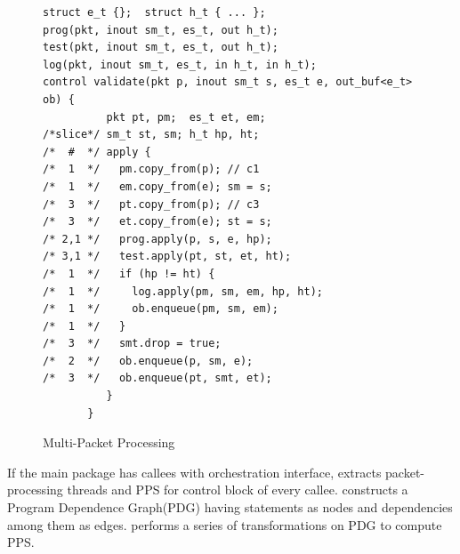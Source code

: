 \documentclass[letterpaper,twocolumn,10pt]{article}
\begin{document}
\label{subsubsection:packet-processing-schedule}
\begin{figure}[!h]
\begin{lstlisting}[frame=none]
struct e_t {};  struct h_t { ... };
prog(pkt, inout sm_t, es_t, out h_t);
test(pkt, inout sm_t, es_t, out h_t);
log(pkt, inout sm_t, es_t, in h_t, in h_t);
control validate(pkt p, inout sm_t s, es_t e, out_buf<e_t> ob) {
          pkt pt, pm;  es_t et, em;  
/*slice*/ sm_t st, sm; h_t hp, ht;
/*  #  */ apply {
/*  1  */   pm.copy_from(p); // c1
/*  1  */   em.copy_from(e); sm = s;
/*  3  */   pt.copy_from(p); // c3 
/*  3  */   et.copy_from(e); st = s;
/* 2,1 */   prog.apply(p, s, e, hp); 
/* 3,1 */   test.apply(pt, st, et, ht); 
/*  1  */   if (hp != ht) {
/*  1  */     log.apply(pm, sm, em, hp, ht);
/*  1  */     ob.enqueue(pm, sm, em);
/*  1  */   }
/*  3  */   smt.drop = true;
/*  2  */   ob.enqueue(p, sm, e);
/*  3  */   ob.enqueue(pt, smt, et);
          }
       }
\end{lstlisting}
\caption{Multi-Packet Processing}
\label{fig:multi-packet-processing}
\end{figure}
If the main package has callees with orchestration interface, \ucomp extracts packet-processing threads and PPS for control block of every callee.
\ucomp constructs a Program Dependence Graph(PDG) \cite{Ferrante:1987:PDG:24039.24041} having statements as nodes and dependencies among them as edges. 
\ucomp  performs a series of transformations on PDG to compute PPS.
\end{document}
